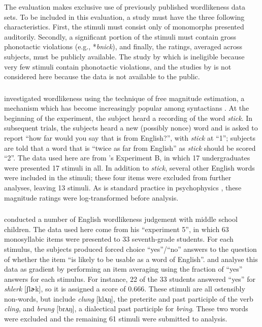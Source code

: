 The evaluation makes exclusive use of previously published wordlikeness data sets. To be included in this evaluation, a study must have the three following characteristics. First, the stimuli must consist only of monomorphs presented auditorily. Secondly, a significant portion of the stimuli must contain gross phonotactic violations (e.g., *\emph{bnick}), and finally, the ratings, averaged across subjects, must be publicly available. The study by \citet{Bailey2001} which is ineligible because very few stimuli contain phonotactic violations, and the studies by \citet{Shademan2007} is not considered here because the data is not available to the public.

\subsubsection{\citealt{Greenberg1964}}

\citet{Greenberg1964} investigated wordlikeness using the technique of free magnitude estimation, a mechanism which has become increasingly popular among syntactians \citep[e.g.,][]{Bard1996}. At the beginning of the experiment, the subject heard a recording of the word \emph{stick}. In subsequent trials, the subjects heard a new (possibly nonce) word and is asked to report ``how far would you say that is from English?'', with \emph{stick} at ``1''; subjects are told that a word that is ``twice as far from English'' as \emph{stick} should be scored ``2''. The data used here are from \citeauthor{Greenberg1964}'s Experiment B, in which 17 undergraduates were presented 17 stimuli in all. In addition to \emph{stick}, several other English words were included in the stimuli; these four items were excluded from further analyses, leaving 13 stimuli. As is standard practice in psychophysics \citep[e.g,]{Butler1987}, these magnitude ratings were log-transformed before analysis.

\subsubsection{\citealt{Scholes1966}}

\citet{Scholes1966} conducted a number of English wordlikeness judgement with middle school children. The data used here come from his ``experiment 5'', in which 63 monosyllabic items were presented to 33 seventh-grade students. For each stimulus, the subjects produced forced choice ``yes''/``no'' answers to the question of whether the item ``is likely to be usable as a word of English''. \citet{Hayes2008a} and \citet{Albright2009a} analyse this data as gradient by performing an item averaging using the fraction of ``yes'' answers for each stimulus. For instance, 22 of the 33 students answered ``yes'' for \emph{shlerk} [ʃlɚk], so it is assigned a score of $0.666$. These stimuli are all ostensibly non-words, but include \emph{clung} [klʌŋ], the preterite and past participle of the verb \emph{cling}, and \emph{brung} [brʌŋ], a dialectical past participle for \emph{bring}. These two words were excluded and the remaining 61 stimuli were submitted to analysis. 

